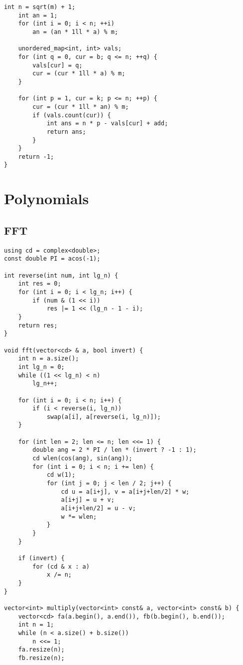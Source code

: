 \documentclass[10pt]{article}
\begin{document}
\begin{multicols*}{2}
\begin{lstlisting}[style=compactcpp]
    int n = sqrt(m) + 1;
    int an = 1;
    for (int i = 0; i < n; ++i)
        an = (an * 1ll * a) % m;

    unordered_map<int, int> vals;
    for (int q = 0, cur = b; q <= n; ++q) {
        vals[cur] = q;
        cur = (cur * 1ll * a) % m;
    }

    for (int p = 1, cur = k; p <= n; ++p) {
        cur = (cur * 1ll * an) % m;
        if (vals.count(cur)) {
            int ans = n * p - vals[cur] + add;
            return ans;
        }
    }
    return -1;
}
\end{lstlisting}

\section{Polynomials}

\subsection{FFT}

\begin{lstlisting}[style=compactcpp]
using cd = complex<double>;
const double PI = acos(-1);

int reverse(int num, int lg_n) {
    int res = 0;
    for (int i = 0; i < lg_n; i++) {
        if (num & (1 << i))
            res |= 1 << (lg_n - 1 - i);
    }
    return res;
}

void fft(vector<cd> & a, bool invert) {
    int n = a.size();
    int lg_n = 0;
    while ((1 << lg_n) < n)
        lg_n++;

    for (int i = 0; i < n; i++) {
        if (i < reverse(i, lg_n))
            swap(a[i], a[reverse(i, lg_n)]);
    }

    for (int len = 2; len <= n; len <<= 1) {
        double ang = 2 * PI / len * (invert ? -1 : 1);
        cd wlen(cos(ang), sin(ang));
        for (int i = 0; i < n; i += len) {
            cd w(1);
            for (int j = 0; j < len / 2; j++) {
                cd u = a[i+j], v = a[i+j+len/2] * w;
                a[i+j] = u + v;
                a[i+j+len/2] = u - v;
                w *= wlen;
            }
        }
    }

    if (invert) {
        for (cd & x : a)
            x /= n;
    }
}

vector<int> multiply(vector<int> const& a, vector<int> const& b) {
    vector<cd> fa(a.begin(), a.end()), fb(b.begin(), b.end());
    int n = 1;
    while (n < a.size() + b.size()) 
        n <<= 1;
    fa.resize(n);
    fb.resize(n);


\end{lstlisting}
\end{multicols*}
\end{document}
